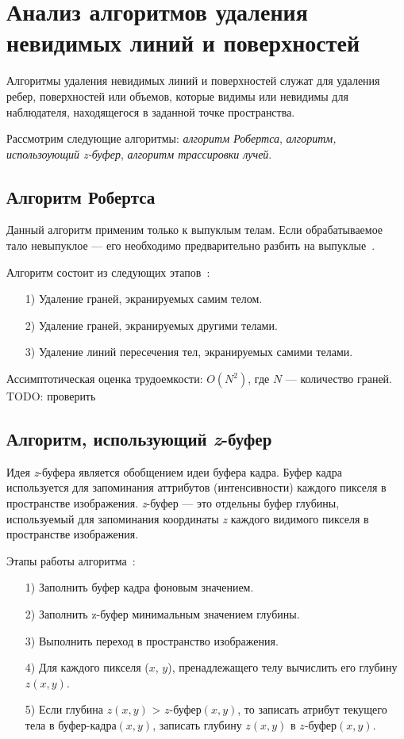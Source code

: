 \section{Анализ алгоритмов удаления невидимых линий и поверхностей}

Алгоритмы удаления невидимых линий и поверхностей служат для удаления ребер, поверхностей или объемов, которые видимы или невидимы для наблюдателя, находящегося в заданной точке пространства\cite{rogers}.

Рассмотрим следующие алгоритмы: \textit{алгоритм Робертса}, \textit{алгоритм, использоующий z-буфер}, \textit{алгоритм трассировки лучей}.

\subsection{Алгоритм Робертса}

Данный алгоритм применим только к выпуклым телам. Если обрабатываемое тало невыпуклое --- его необходимо предварительно разбить на выпуклые~\cite{rogers}.

Алгоритм состоит из следующих этапов~\cite{rogers}:
\begin{enumerate}
    \item[1)] Удаление граней, экранируемых самим телом.
    \item[2)] Удаление граней, экранируемых другими телами.
    \item[3)] Удаление линий пересечения тел, экранируемых самими телами.
\end{enumerate}

Ассимптотическая оценка трудоемкости: $O(N^2)$, где $N$ --- количество граней. TODO: проверить

\subsection{Алгоритм, использующий \textit{z}-буфер}

Идея \textit{z}-буфера является обобщением идеи буфера кадра. Буфер кадра используется для запоминания аттрибутов (интенсивности) каждого пикселя в пространстве изображения. \textit{z}-буфер --- это отдельны буфер глубины, используемый для запоминания координаты \textit{z} каждого видимого пикселя в пространстве изображения\cite{rogers}.

Этапы работы алгоритма~\cite{rogers}:

\begin{enumerate}
    \item[1)] Заполнить буфер кадра фоновым значением.
    \item[2)] Заполнить z-буфер минимальным значением глубины.
    \item[3)] Выполнить переход в пространство изображения.
    \item[4)] Для каждого пикселя ($x$, $y$), пренадлежащего телу вычислить его глубину $z(x, y)$.
    \item[5)] Если глубина $z(x, y)$ > $z\textit{-буфер}(x, y)$, то записать атрибут текущего тела в $\textit{буфер-кадра}(x, y)$, записать глубину $z(x, y)$ в $z\textit{-буфер}(x, y)$.
\end{enumerate}


